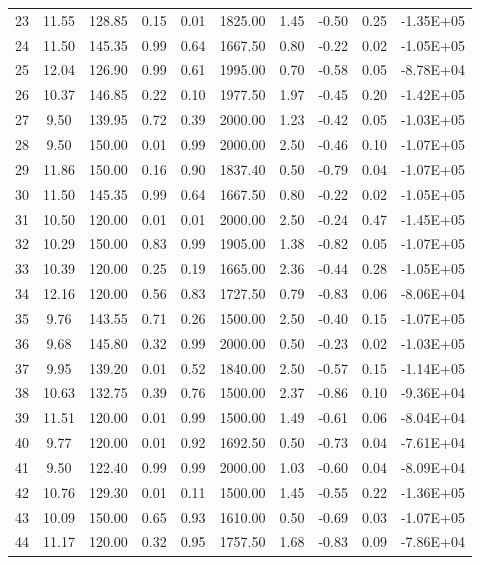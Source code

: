 \begin{landscape}
\begin{center}
\begin{longtable}{|c|c|c|c|c|c|c|c|c|c|}
23 & 11.55 & 128.85 & 0.15 & 0.01 & 1825.00 & 1.45 & -0.50 & 0.25 & -1.35E+05 \\
24 & 11.50 & 145.35 & 0.99 & 0.64 & 1667.50 & 0.80 & -0.22 & 0.02 & -1.05E+05 \\
25 & 12.04 & 126.90 & 0.99 & 0.61 & 1995.00 & 0.70 & -0.58 & 0.05 & -8.78E+04 \\
26 & 10.37 & 146.85 & 0.22 & 0.10 & 1977.50 & 1.97 & -0.45 & 0.20 & -1.42E+05 \\
27 & 9.50  & 139.95 & 0.72 & 0.39 & 2000.00 & 1.23 & -0.42 & 0.05 & -1.03E+05 \\
28 & 9.50  & 150.00 & 0.01 & 0.99 & 2000.00 & 2.50 & -0.46 & 0.10 & -1.07E+05 \\
29 & 11.86 & 150.00 & 0.16 & 0.90 & 1837.40 & 0.50 & -0.79 & 0.04 & -1.07E+05 \\
30 & 11.50 & 145.35 & 0.99 & 0.64 & 1667.50 & 0.80 & -0.22 & 0.02 & -1.05E+05 \\
31 & 10.50 & 120.00 & 0.01 & 0.01 & 2000.00 & 2.50 & -0.24 & 0.47 & -1.45E+05 \\
32 & 10.29 & 150.00 & 0.83 & 0.99 & 1905.00 & 1.38 & -0.82 & 0.05 & -1.07E+05 \\
33 & 10.39 & 120.00 & 0.25 & 0.19 & 1665.00 & 2.36 & -0.44 & 0.28 & -1.05E+05 \\
34 & 12.16 & 120.00 & 0.56 & 0.83 & 1727.50 & 0.79 & -0.83 & 0.06 & -8.06E+04 \\
35 & 9.76  & 143.55 & 0.71 & 0.26 & 1500.00 & 2.50 & -0.40 & 0.15 & -1.07E+05 \\
36 & 9.68  & 145.80 & 0.32 & 0.99 & 2000.00 & 0.50 & -0.23 & 0.02 & -1.03E+05 \\
37 & 9.95  & 139.20 & 0.01 & 0.52 & 1840.00 & 2.50 & -0.57 & 0.15 & -1.14E+05 \\
38 & 10.63 & 132.75 & 0.39 & 0.76 & 1500.00 & 2.37 & -0.86 & 0.10 & -9.36E+04 \\
39 & 11.51 & 120.00 & 0.01 & 0.99 & 1500.00 & 1.49 & -0.61 & 0.06 & -8.04E+04 \\
40 & 9.77  & 120.00 & 0.01 & 0.92 & 1692.50 & 0.50 & -0.73 & 0.04 & -7.61E+04 \\
41 & 9.50  & 122.40 & 0.99 & 0.99 & 2000.00 & 1.03 & -0.60 & 0.04 & -8.09E+04 \\
42 & 10.76 & 129.30 & 0.01 & 0.11 & 1500.00 & 1.45 & -0.55 & 0.22 & -1.36E+05 \\
43 & 10.09 & 150.00 & 0.65 & 0.93 & 1610.00 & 0.50 & -0.69 & 0.03 & -1.07E+05 \\
44 & 11.17 & 120.00 & 0.32 & 0.95 & 1757.50 & 1.68 & -0.83 & 0.09 & -7.86E+04 \\

\end{longtable}
\end{center}
\end{landscape}
